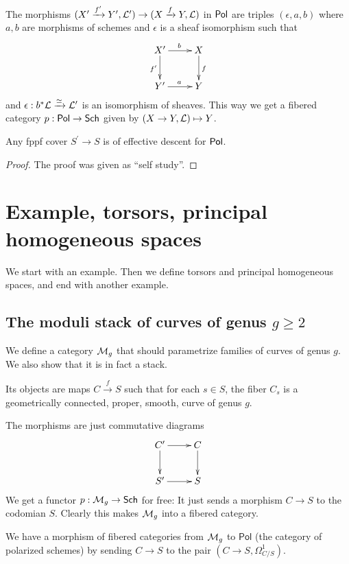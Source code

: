 \documentclass[11pt, english]{article}
\begin{document}
The morphisms $(X^\prime \xrightarrow{f^\prime} Y^\prime, \mathcal{L}^\prime) \to (X \xrightarrow{f} Y, \mathcal{L})$ in $\mathsf{Pol}$ are triples $(\epsilon, a,b)$ where $a,b$ are morphisms of schemes and $\epsilon$ is a sheaf isomorphism such that
\[
\xymatrix{
X^\prime \ar[r]^b \ar[d]_{f^\prime} & X \ar[d]^f \\
Y^\prime \ar[r]^a & Y
}
\]
and $\epsilon:b^\ast \mathcal{L} \xrightarrow{\simeq} \mathcal{L}^\prime$ is an isomorphism of sheaves. This way we get a fibered category $p:\mathsf{Pol} \to \mathsf{Sch}$ given by $(X \to Y, \mathcal{L}) \mapsto Y$.

\begin{prop}
Any fppf cover $S^\prime \to S$ is of effective descent for $\mathsf{Pol}$.
\end{prop}
\begin{proof}
The proof was given as ``self study''.
\end{proof}

\pagebreak
\section{Example, torsors, principal homogeneous spaces}

We start with an example. Then we define torsors and principal homogeneous spaces, and end with another example. 


\subsection{The moduli stack of curves of genus $ g \geq 2$}
\label{subsec:mg}

We define a category $\mathcal{M}_g$ that should parametrize families of curves of genus $g$. We also show that it is in fact a stack.

Its objects are maps $C \xrightarrow{f} S$ such that for each $s \in S$, the fiber $C_s$ is a geometrically connected, proper, smooth, curve of genus $g$.

The morphisms are just commutative diagrams
\[
\xymatrix{
C^\prime \ar[r] \ar[d] & C \ar[d] \\
S^\prime \ar[r] & S
}
\]
We get a functor $p:\mathcal{M}_g \to \mathsf{Sch}$ for free: It just sends a morphism $C \to S$ to the codomian $S$. Clearly this makes $\mathcal{M}_g$ into a fibered category. 

We have a morphism of fibered categories from $\mathcal{M}_g$ to $\mathsf{Pol}$  (the category of polarized schemes) by sending $C \to S$ to the pair $(C \to S, \Omega_{C/S} ^1)$.
\end{document}
